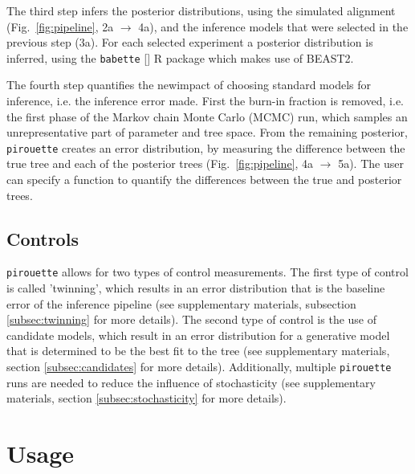 The third step infers the posterior distributions,
using the simulated alignment (Fig.~\ref{fig:pipeline}, 2a $\rightarrow$ 4a),
and the inference models that were selected in the previous step (3a). 
For each selected experiment a posterior distribution is inferred, using the 
\verb;babette; [\cite{bilderbeek2018babette}] R package which makes use of BEAST2. 

The fourth step quantifies the new{impact of choosing standard models for inference, i.e.} the inference error made. 
First the burn-in fraction is removed, i.e. the first phase of the 
Markov chain Monte Carlo (MCMC) run,
which samples an unrepresentative part of parameter and tree space. 
From the remaining posterior, \verb;pirouette; 
creates an error distribution, by measuring the difference
between the true tree and each of the posterior 
trees (Fig.~\ref{fig:pipeline}, 4a $\rightarrow$ 5a).
The user can specify a function to quantify the differences between
the true and posterior trees. 

\subsection{Controls}\label{subsec:controls}

\verb;pirouette; allows for
two types of control measurements. The first type of control
is called 'twinning', which results in an error distribution
that is the baseline error of the inference pipeline (see
supplementary materials, subsection \ref{subsec:twinning} for more details). 
The second type of control is the use of candidate models,
which result in an error distribution
for a generative model that is determined to be the best fit to
the tree (see supplementary materials, 
section \ref{subsec:candidates} for more details). 
Additionally, multiple \verb;pirouette; runs are needed
to reduce the influence of stochasticity (see supplementary materials, 
section \ref{subsec:stochasticity} for more details).

\section{Usage}

